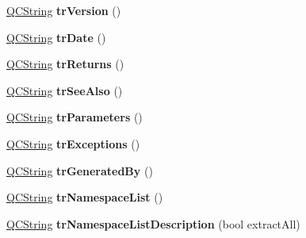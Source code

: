 \begin{DoxyCompactItemize}
\item 
\hypertarget{class_translator_slovene_ae87e51832e87155cee39f9446452eea5}{\hyperlink{class_q_c_string}{Q\-C\-String} {\bfseries tr\-Version} ()}\label{class_translator_slovene_ae87e51832e87155cee39f9446452eea5}

\item 
\hypertarget{class_translator_slovene_a8a42054aac49264702e63d0048612a63}{\hyperlink{class_q_c_string}{Q\-C\-String} {\bfseries tr\-Date} ()}\label{class_translator_slovene_a8a42054aac49264702e63d0048612a63}

\item 
\hypertarget{class_translator_slovene_a866a7410912e8a146c122548bcc313d5}{\hyperlink{class_q_c_string}{Q\-C\-String} {\bfseries tr\-Returns} ()}\label{class_translator_slovene_a866a7410912e8a146c122548bcc313d5}

\item 
\hypertarget{class_translator_slovene_ae2a38af2f296dd4c81df824a17ac5024}{\hyperlink{class_q_c_string}{Q\-C\-String} {\bfseries tr\-See\-Also} ()}\label{class_translator_slovene_ae2a38af2f296dd4c81df824a17ac5024}

\item 
\hypertarget{class_translator_slovene_aed4586c549471023ca731d18612fe1d6}{\hyperlink{class_q_c_string}{Q\-C\-String} {\bfseries tr\-Parameters} ()}\label{class_translator_slovene_aed4586c549471023ca731d18612fe1d6}

\item 
\hypertarget{class_translator_slovene_afd184af42e35d6ef611899532f80935c}{\hyperlink{class_q_c_string}{Q\-C\-String} {\bfseries tr\-Exceptions} ()}\label{class_translator_slovene_afd184af42e35d6ef611899532f80935c}

\item 
\hypertarget{class_translator_slovene_a131935c84cc3cc61a5b62f41619cb163}{\hyperlink{class_q_c_string}{Q\-C\-String} {\bfseries tr\-Generated\-By} ()}\label{class_translator_slovene_a131935c84cc3cc61a5b62f41619cb163}

\item 
\hypertarget{class_translator_slovene_a39eed55e25c2d4229943f15d313d3f1f}{\hyperlink{class_q_c_string}{Q\-C\-String} {\bfseries tr\-Namespace\-List} ()}\label{class_translator_slovene_a39eed55e25c2d4229943f15d313d3f1f}

\item 
\hypertarget{class_translator_slovene_a4deddc96cf84bd66a4ffb8174a5d052b}{\hyperlink{class_q_c_string}{Q\-C\-String} {\bfseries tr\-Namespace\-List\-Description} (bool extract\-All)}\label{class_translator_slovene_a4deddc96cf84bd66a4ffb8174a5d052b}


\end{DoxyCompactItemize}
